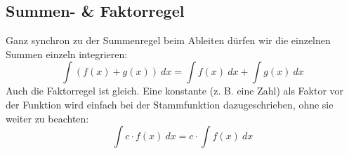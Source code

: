 \subsection{Summen- \& Faktorregel}
	Ganz synchron zu der Summenregel beim Ableiten dürfen wir die einzelnen Summen
	einzeln integrieren:
	\[\int (f(x)+g(x))\ dx=\int f(x)\ dx+\int g(x)\ dx\]
	Auch die Faktorregel ist gleich. Eine konstante (z. B. eine Zahl) als Faktor
	vor der Funktion wird einfach bei der Stammfunktion dazugeschrieben, ohne sie
	weiter zu beachten:
	\[\int c\cdot f(x)\ dx=c\cdot \int f(x)\ dx\]
